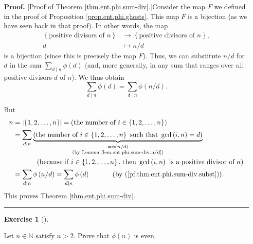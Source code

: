 \documentclass[numbers=enddot,12pt,final,onecolumn,notitlepage]{scrartcl}%
\newcounter{exer}
\numberwithin{exer}{subsection}
\theoremstyle{definition}
\newtheorem{exmp}[exer]{Exercise}
\newenvironment{exercise}[1][]
{\begin{exmp}[#1]\begin{leftbar}}
{\end{leftbar}\end{exmp}}
\newenvironment{proof}[1][Proof]{\noindent\textbf{#1.} }{\ \rule{0.5em}{0.5em}}
\let\sumnonlimits\sum
\renewcommand{\sum}{\sumnonlimits\limits}
\begin{document}
\begin{proof}
[Proof of Theorem \ref{thm.ent.phi.sum-div}.]Consider the map $F$ we defined
in the proof of Proposition \ref{prop.ent.phi.ghosts}. This map $F$ is a
bijection (as we have seen back in that proof). In other words, the map%
\begin{align*}
\left\{  \text{positive divisors of }n\right\}   &  \rightarrow\left\{
\text{positive divisors of }n\right\}  ,\\
d  &  \mapsto n/d
\end{align*}
is a bijection (since this is precisely the map $F$). Thus, we can substitute
$n/d$ for $d$ in the sum $\sum_{d\mid n}\phi\left(  d\right)  $ (and, more
generally, in any sum that ranges over all positive divisors $d$ of $n$). We
thus obtain%
\begin{equation}
\sum_{d\mid n}\phi\left(  d\right)  =\sum_{d\mid n}\phi\left(  n/d\right)  .
\label{pf.thm.ent.phi.sum-div.subst}%
\end{equation}


But%
\begin{align*}
n  &  =\left\vert \left\{  1,2,\ldots,n\right\}  \right\vert =\left(
\text{the number of }i\in\left\{  1,2,\ldots,n\right\}  \right) \\
&  =\sum_{d\mid n}\underbrace{\left(  \text{the number of }i\in\left\{
1,2,\ldots,n\right\}  \text{ such that }\gcd\left(  i,n\right)  =d\right)
}_{\substack{=\phi\left(  n/d\right)  \\\text{(by Lemma
\ref{lem.ent.phi.sum-div.n/d})}}}\\
&  \ \ \ \ \ \ \ \ \ \ \left(  \text{because if }i\in\left\{  1,2,\ldots
,n\right\}  \text{, then }\gcd\left(  i,n\right)  \text{ is a positive divisor
of }n\right) \\
&  =\sum_{d\mid n}\phi\left(  n/d\right)  =\sum_{d\mid n}\phi\left(  d\right)
\ \ \ \ \ \ \ \ \ \ \left(  \text{by (\ref{pf.thm.ent.phi.sum-div.subst}%
)}\right)  .
\end{align*}
This proves Theorem \ref{thm.ent.phi.sum-div}.
\end{proof}

\begin{exercise}
\label{exe.ent.phi.even}Let $n\in\mathbb{N}$ satisfy $n>2$. Prove that
$\phi\left(  n\right)  $ is even.
\end{exercise}
\end{document}
